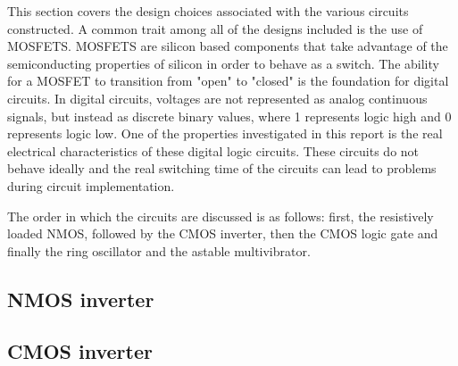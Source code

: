 



This section covers the design choices associated with the various circuits constructed. A common trait among all of the designs included is the use of  MOSFETS. MOSFETS are silicon based components that take advantage of the semiconducting properties of silicon in order to behave as a switch. The ability for a MOSFET to transition from "open" to "closed" is the foundation for digital circuits. In digital circuits, voltages are not represented as analog continuous signals, but instead as discrete binary values, where 1 represents logic high and 0 represents logic low. One of the properties investigated in this report is the real electrical characteristics of these digital logic circuits. These circuits do not behave ideally and the real switching time of the circuits can lead to problems during circuit implementation.

The order in which the circuits are discussed is as follows: first, the resistively loaded NMOS, followed by the CMOS inverter, then the CMOS logic gate and finally the ring oscillator and the astable multivibrator. 

\subsection{NMOS inverter}
    

\subsection{CMOS inverter}
    






